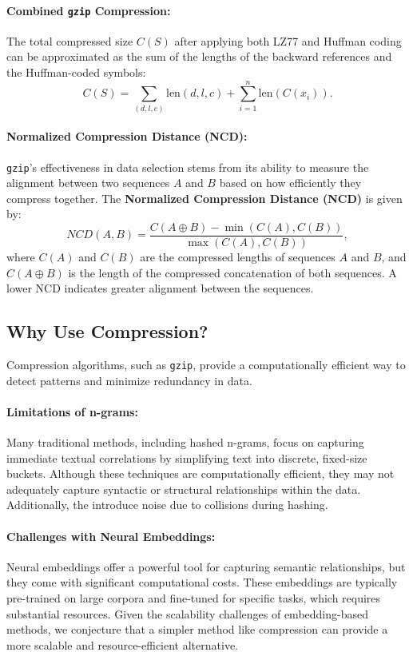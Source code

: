 \paragraph{Combined \texttt{gzip} Compression:}
The total compressed size \( C(S) \) after applying both LZ77 and Huffman coding can be approximated as the sum of the lengths of the backward references and the Huffman-coded symbols:
\[
C(S) = \sum_{(d, l, c)} \text{len}(d, l, c) + \sum_{i=1}^{n} \text{len}(C(x_i)).
\]

\paragraph{Normalized Compression Distance (NCD):}
\texttt{gzip}’s effectiveness in data selection stems from its ability to measure the alignment between two sequences \( A \) and \( B \) based on how efficiently they compress together. The \textbf{Normalized Compression Distance (NCD)} is given by:
\[
NCD(A, B) = \frac{C(A \oplus B) - \min(C(A), C(B))}{\max(C(A), C(B))},
\]
where \( C(A) \) and \( C(B) \) are the compressed lengths of sequences \( A \) and \( B \), and \( C(A \oplus B) \) is the length of the compressed concatenation of both sequences. 
A lower NCD indicates greater alignment between the sequences.


\subsection{Why Use Compression?}

Compression algorithms, such as \texttt{gzip}, provide a computationally efficient way to detect patterns and minimize redundancy in data. 
\paragraph{Limitations of n-grams:} Many traditional methods, including hashed n-grams, focus on capturing immediate textual correlations by simplifying text into discrete, fixed-size buckets. 
Although these techniques are computationally efficient, they may not adequately capture syntactic or structural relationships within the data. Additionally, the introduce noise due to collisions during hashing.

\paragraph{Challenges with Neural Embeddings:} Neural embeddings offer a powerful tool for capturing semantic relationships, but they come with significant computational costs. These embeddings are typically pre-trained on large corpora and fine-tuned for specific tasks, which requires substantial resources. Given the scalability challenges of embedding-based methods, we conjecture that a simpler method like compression can provide a more scalable and resource-efficient alternative.

